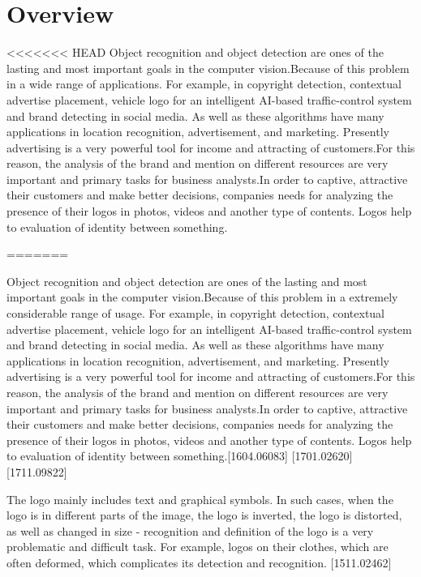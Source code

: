 \section{Overview} \label{sec:1.1}
\vspace{-0.5cm}
<<<<<<< HEAD
\noindent Object recognition and object detection are ones of the lasting and most important goals in the computer vision.Because of this problem in a wide range of applications. For example, in copyright detection, contextual advertise placement, vehicle logo for an intelligent AI-based traffic-control system and brand detecting in social media. As well as these algorithms have many applications in location recognition, advertisement, and marketing. Presently advertising is a very powerful tool for income and attracting of customers.For this reason, the analysis of the brand and mention on different resources are very important and primary tasks for business analysts.In order to captive, attractive their customers and make better decisions, companies needs for analyzing the presence of their logos in photos, videos and another type of contents. Logos help to evaluation of identity between something. 

\vspace{-0.5cm}

\noindent 

=======
\par Object recognition and object detection are ones of the lasting and most important goals in the computer vision.Because of this problem in a extremely considerable range of usage. For example, in copyright detection, contextual advertise placement, vehicle logo for an intelligent AI-based traffic-control system and brand detecting in social media. As well as these algorithms have many applications in location recognition, advertisement, and marketing. Presently advertising is a very powerful tool for income and attracting of customers.For this reason, the analysis of the brand and mention on different resources are very important and primary tasks for business analysts.In order to captive, attractive their customers and make better decisions, companies needs for analyzing the presence of their logos in photos, videos and another type of contents. Logos help to evaluation of identity between something.[1604.06083] [1701.02620] [1711.09822]

\vspace{-0.5cm}
\par The logo mainly includes text and graphical symbols. In such cases, when the logo is in different parts of the image, the logo is inverted, the logo is distorted, as well as changed in size - recognition and definition of the logo is a very problematic and difficult task. For example, logos on their clothes, which are often deformed, which complicates its detection and recognition. [1511.02462]

